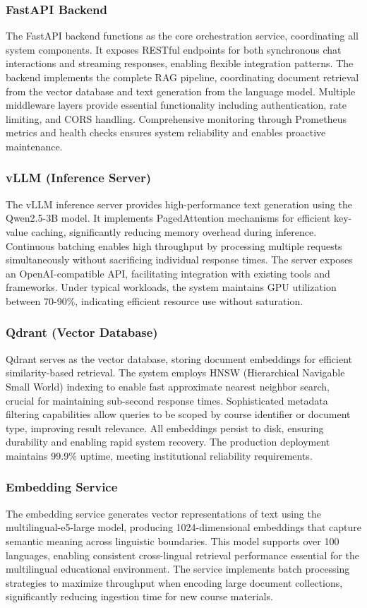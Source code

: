 \documentclass[12pt,a4paper]{article}
\begin{document}
\subsubsection{FastAPI Backend}
The FastAPI backend functions as the core orchestration service, coordinating all system components. It exposes RESTful endpoints for both synchronous chat interactions and streaming responses, enabling flexible integration patterns. The backend implements the complete RAG pipeline, coordinating document retrieval from the vector database and text generation from the language model. Multiple middleware layers provide essential functionality including authentication, rate limiting, and CORS handling. Comprehensive monitoring through Prometheus metrics and health checks ensures system reliability and enables proactive maintenance.

\subsubsection{vLLM (Inference Server)}
The vLLM inference server provides high-performance text generation using the Qwen2.5-3B model. It implements PagedAttention mechanisms for efficient key-value caching, significantly reducing memory overhead during inference. Continuous batching enables high throughput by processing multiple requests simultaneously without sacrificing individual response times. The server exposes an OpenAI-compatible API, facilitating integration with existing tools and frameworks. Under typical workloads, the system maintains GPU utilization between 70-90\%, indicating efficient resource use without saturation.

\subsubsection{Qdrant (Vector Database)}
Qdrant serves as the vector database, storing document embeddings for efficient similarity-based retrieval. The system employs HNSW (Hierarchical Navigable Small World) indexing to enable fast approximate nearest neighbor search, crucial for maintaining sub-second response times. Sophisticated metadata filtering capabilities allow queries to be scoped by course identifier or document type, improving result relevance. All embeddings persist to disk, ensuring durability and enabling rapid system recovery. The production deployment maintains 99.9\% uptime, meeting institutional reliability requirements.

\subsubsection{Embedding Service}
The embedding service generates vector representations of text using the multilingual-e5-large model, producing 1024-dimensional embeddings that capture semantic meaning across linguistic boundaries. This model supports over 100 languages, enabling consistent cross-lingual retrieval performance essential for the multilingual educational environment. The service implements batch processing strategies to maximize throughput when encoding large document collections, significantly reducing ingestion time for new course materials.
\end{document}

